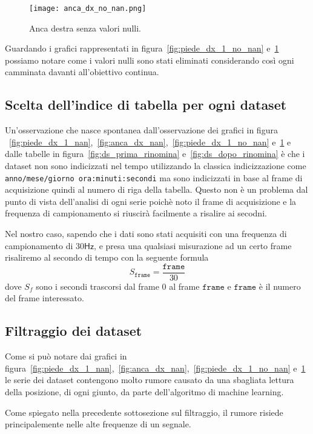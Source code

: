 \begin{figure}[H]
    \centering
    \texttt{[image: anca\_dx\_no\_nan.png]}
    \caption{Anca destra senza valori nulli.}
    \label{fig:anca_dx_no_nan}
\end{figure}

Guardando i grafici rappresentati in figura~\ref*{fig:piede_dx_1_no_nan} e~\ref*{fig:anca_dx_no_nan}
possiamo notare come i valori nulli sono stati eliminati considerando così ogni camminata 
davanti all'obiettivo continua.


\subsection{Scelta dell'indice di tabella per ogni dataset}
Un'osservazione che nasce spontanea dall'osservazione dei grafici in figura
~\ref*{fig:piede_dx_1_nan},~\ref*{fig:anca_dx_nan},~\ref*{fig:piede_dx_1_no_nan}
e~\ref*{fig:anca_dx_no_nan} e dalle tabelle in figura~\ref*{fig:ds_prima_rinomina}
e~\ref*{fig:ds_dopo_rinomina} è che i dataset non sono indicizzati nel tempo utilizzando
la classica indicizzazione come \texttt{anno/mese/giorno ora:minuti:secondi} ma sono indicizzati
in base al frame di acquisizione quindi al numero di riga della tabella.
Questo non è un problema dal punto di vista dell'analisi di ogni serie poichè noto il frame
di acquisizione e la frequenza di campionamento si riuscirà facilmente a risalire ai secodni.

Nel nostro caso, sapendo che i dati sono stati acquisiti con una frequenza di campionamento di 
$30\mathsf{Hz}$, e presa una qualsiasi misurazione ad un certo frame risaliremo al secondo
di tempo con la seguente formula
\[ S_\texttt{frame} = \frac{\texttt{frame}}{30} \]
dove $S_f$ sono i secondi trascorsi dal frame $0$ al frame $\texttt{frame}$ e $\texttt{frame}$ 
è il numero del frame interessato.


\subsection{Filtraggio dei dataset}
Come si può notare dai grafici in figura~\ref*{fig:piede_dx_1_nan},~\ref*{fig:anca_dx_nan},~\ref*{fig:piede_dx_1_no_nan}
e~\ref*{fig:anca_dx_no_nan} le serie dei dataset contengono molto rumore causato da una sbagliata 
lettura della posizione, di ogni giunto, da parte dell'algoritmo di machine learning.

Come spiegato nella precedente sottosezione sul filtraggio, il rumore risiede principalemente nelle
alte frequenze di un segnale.

